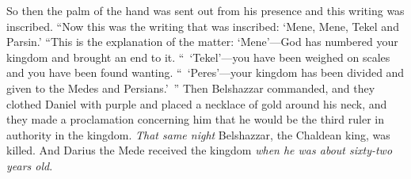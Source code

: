 \begin{biblechapter}
\verse So then the palm of the hand was sent out from his presence and this writing was inscribed.
\verse “Now this was the writing that was inscribed: ‘Mene, Mene, Tekel and Parsin.’
\verse “This is the explanation of the matter: ‘Mene’—God has numbered your kingdom and brought an end to it.
\verse “ ‘Tekel’—you have been weighed on scales and you have been found wanting.
\verse “ ‘Peres’—your kingdom has been divided and given to the Medes and Persians.’ ”
\verse Then Belshazzar commanded, and they clothed Daniel with purple and placed a necklace of gold around his neck, and they made a proclamation concerning him that he would be the third ruler in authority in the kingdom.
\verse \textit{That same night} Belshazzar, the Chaldean king, was killed.
\verse  And Darius the Mede received the kingdom \textit{when he was about sixty-two years old}.
\end{biblechapter}

